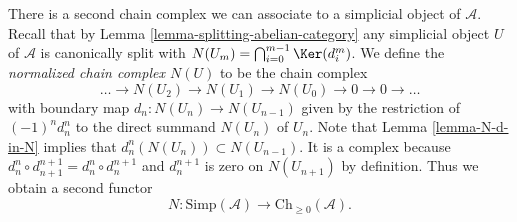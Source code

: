 \noindent
There is a second chain complex we can associate to
a simplicial object of $\mathcal{A}$. Recall that by
Lemma \ref{lemma-splitting-abelian-category}
any simplicial object $U$ of $\mathcal{A}$
is canonically split with
$N(U_m) = \bigcap_{i = 0}^{m - 1} \Ker(d^m_i)$.
We define the {\it normalized chain complex $N(U)$}
to be the chain complex
$$
\ldots \to N(U_2) \to N(U_1) \to N(U_0) \to 0 \to 0 \to \ldots
$$
with boundary map $d_n : N(U_n) \to N(U_{n - 1})$ given
by the restriction of $(-1)^nd^n_n$ to the direct summand
$N(U_n)$ of $U_n$. Note that Lemma \ref{lemma-N-d-in-N}
implies that $d^n_n(N(U_n)) \subset N(U_{n - 1})$.
It is a complex because
$d^n_n \circ d^{n + 1}_{n + 1} = d^n_n \circ d^{n + 1}_n$
and $d^{n + 1}_n$ is zero on $N(U_{n + 1})$ by definition.
Thus we obtain a second functor
$$
N : \text{Simp}(\mathcal{A}) \longrightarrow \text{Ch}_{\geq 0}(\mathcal{A}).
$$
